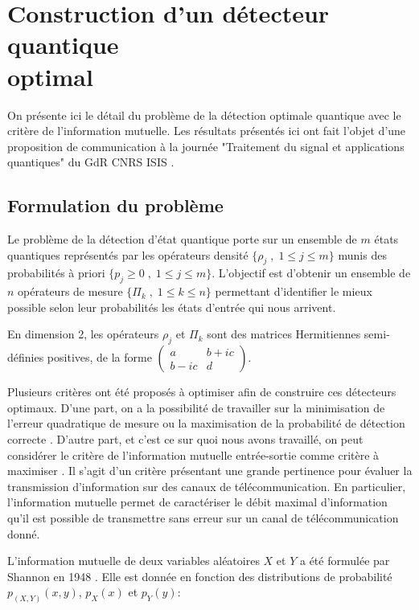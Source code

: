 \chapter[Construction d'un détecteur quantique optimal]{Construction d'un détecteur quantique \\ optimal}

On présente ici le détail du problème de la détection optimale quantique avec le critère de l'information mutuelle. Les résultats présentés ici ont fait l'objet d'une proposition de communication à la journée "Traitement du signal et applications quantiques" du GdR CNRS ISIS \cite{engelstein21}.

\section{Formulation du problème}
Le problème de la détection d'état quantique porte sur un ensemble de $m$ états quantiques représentés par les opérateurs densité $\{\rho_j \; , \; 1 \leq j \leq m\}$ munis des probabilités à priori $\{p_j \geq 0 \; , \; 1 \leq j \leq m \}$. L'objectif est d'obtenir un ensemble de $n$ opérateurs de mesure $\{\Pi_k \; , \; 1 \leq k \leq n\}$ permettant d'identifier le mieux possible selon leur probabilités les états d'entrée qui nous arrivent.

En dimension 2, les opérateurs $\rho_j$ et $\Pi_k$ sont des matrices Hermitiennes semi-définies positives, de la forme $\begin{pmatrix}a & b+ic \\ b-ic & d \end{pmatrix}$.

Plusieurs critères ont été proposés à optimiser afin de construire ces détecteurs optimaux. D'une part, on a la possibilité de travailler sur la minimisation de l'erreur quadratique de mesure \cite{Eldar01} ou la maximisation de la probabilité de détection correcte \cite{Eldar03c}. D'autre part, et c'est ce sur quoi nous avons travaillé, on peut considérer le critère de l'information mutuelle entrée-sortie comme critère à maximiser \cite{Davies78}. Il s'agit d'un critère présentant une grande pertinence pour évaluer la transmission d'information sur des canaux de télécommunication. En particulier, l'information mutuelle permet de caractériser le débit maximal d'information qu'il est possible de transmettre sans erreur sur un canal de télécommunication donné.

\medbreak
L'information mutuelle de deux variables aléatoires $X$ et $Y$ a été formulée par Shannon en 1948 \cite{Shannon48}. Elle est donnée en fonction des distributions de probabilité $p_{(X, Y)}(x, y)$, $p_X(x)$ et $p_Y(y)$:


